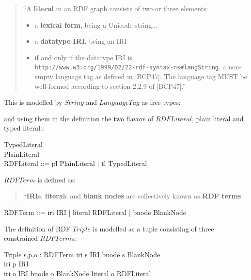 \documentclass[fuzz]{llncs}
\begin{document}
\begin{quote}
``A \textbf{literal} in an RDF graph consists of two or three elements:
\begin{itemize}
\item a \textbf{lexical form}, being a Unicode string...
\item a \textbf{datatype IRI}, being an IRI
\item if and only if the datatype IRI is \\
\verb|http://www.w3.org/1999/02/22-rdf-syntax-ns#langString|, a non-empty language tag as defined in [BCP47]\cite{BCP47}. The language tag MUST be well-formed according to section 2.2.9 of [BCP47]\cite{BCP47}.''
\end{itemize}
\end{quote}
This is modelled by $String$ and $LanguageTag$ as free types:
\begin{zed}
\end{zed}
and using them in the definition the two flavors of $RDFLiteral$,  plain literal and typed literal::
\begin{zed}
TypedLiteral  \\
PlainLiteral  \\
RDFLiteral ::= pl \ldata PlainLiteral \rdata | tl \ldata TypedLiteral \rdata \\ 
\end{zed}
$RDFTerm$ is defined as:
\begin{quote}
``\textbf{IRI}s, \textbf{literal}s and \textbf{blank nodes} are collectively known as \textbf{RDF terms}
\end{quote}

\begin{zed}
RDFTerm ::= iri \ldata IRI \rdata | literal \ldata RDFLiteral \rdata | bnode \ldata BlankNode \rdata
\end{zed}
The definition of RDF $Triple$ is modelled as a tuple consisting of three constrained $RDFTerm$s:
\begin{schema}{Triple}
   s,p,o : RDFTerm
\where
   iri \inv s \in IRI \lor bnode \inv s \in BlankNode \\
   iri \inv p \in IRI \\
   iri \inv o \in IRI \lor bnode \inv o \in BlankNode \lor literal \inv o \in RDFLiteral
\end{schema}
\end{document}
